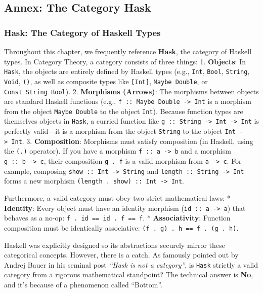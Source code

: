 \documentclass[
]{article}
\begin{document}
\subsection{Annex: The Category Hask}\label{annex-the-category-hask}

\subsubsection{Hask: The Category of Haskell
Types}\label{hask-the-category-of-haskell-types}

Throughout this chapter, we frequently reference \textbf{Hask}, the
category of Haskell types. In Category Theory, a category consists of
three things: 1. \textbf{Objects}: In \texttt{Hask}, the objects are
entirely defined by Haskell types (e.g., \texttt{Int}, \texttt{Bool},
\texttt{String}, \texttt{Void}, \texttt{()}, as well as composite types
like \texttt{{[}Int{]}}, \texttt{Maybe\ Double}, or
\texttt{Const\ String\ Bool}). 2. \textbf{Morphisms (Arrows)}: The
morphisms between objects are standard Haskell functions (e.g.,
\texttt{f\ ::\ Maybe\ Double\ -\textgreater{}\ Int} is a morphism from
the object \texttt{Maybe\ Double} to the object \texttt{Int}). Because
function types are themselves objects in \texttt{Hask}, a curried
function like
\texttt{g\ ::\ String\ -\textgreater{}\ Int\ -\textgreater{}\ Int} is
perfectly valid---it is a morphism from the object \texttt{String} to
the object \texttt{Int\ -\textgreater{}\ Int}. 3. \textbf{Composition}:
Morphisms must satisfy composition (in Haskell, using the \texttt{(.)}
operator). If you have a morphism \texttt{f\ ::\ a\ -\textgreater{}\ b}
and a morphism \texttt{g\ ::\ b\ -\textgreater{}\ c}, their composition
\texttt{g\ .\ f} is a valid morphism from
\texttt{a\ -\textgreater{}\ c}. For example, composing
\texttt{show\ ::\ Int\ -\textgreater{}\ String} and
\texttt{length\ ::\ String\ -\textgreater{}\ Int} forms a new morphism
\texttt{(length\ .\ show)\ ::\ Int\ -\textgreater{}\ Int}.

Furthermore, a valid category must obey two strict mathematical laws: *
\textbf{Identity}: Every object must have an identity morphism
(\texttt{id\ ::\ a\ -\textgreater{}\ a}) that behaves as a no-op:
\texttt{f\ .\ id\ ==\ id\ .\ f\ ==\ f}. * \textbf{Associativity}:
Function composition must be identically associative:
\texttt{(f\ .\ g)\ .\ h\ ==\ f\ .\ (g\ .\ h)}.

Haskell was explicitly designed so its abstractions securely mirror
these categorical concepts. However, there is a catch. As famously
pointed out by Andrej Bauer in his seminal post \emph{``Hask is not a
category''}, is \texttt{Hask} strictly a valid category from a rigorous
mathematical standpoint? The technical answer is \textbf{No}, and it's
because of a phenomenon called ``Bottom''.
\end{document}
